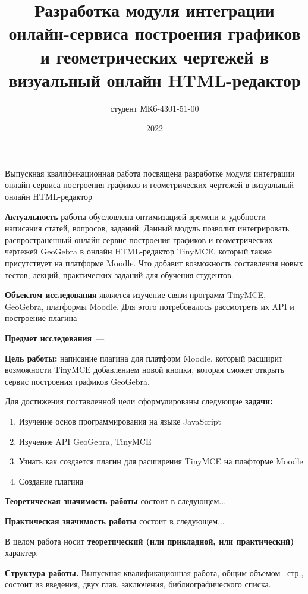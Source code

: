 \documentclass[14pt,Diplom]{diplomwork}
\date{2022}
\author{студент МКб-4301-51-00}{Мельков Алексей Константинович}
\title{Разработка модуля интеграции онлайн-сервиса построения графиков и геометрических чертежей в визуальный онлайн HTML-редактор}
\institute{математики и информационных систем}
\begin{document}
	
\maketitle
\makereferat		%
\newpage

\tableofcontents


Выпускная квалификационная работа посвящена разработке модуля интеграции онлайн-сервиса построения графиков и геометрических чертежей в визуальный онлайн HTML-редактор


\textbf{Актуальность} работы обусловлена оптимизацией времени и удобности написания статей, вопросов, заданий. Данный модуль позволит интегрировать распространенный онлайн-сервис построения графиков и геометрических чертежей GeoGebra в онлайн HTML-редактор TinyMCE, который также присутствует на платформе Moodle. Что добавит возможность составления новых тестов, лекций, практических заданий для обучения студентов.

\textbf{Объектом исследования} является изучение связи программ TinyMCE, GeoGebra, платформы Moodle. Для этого потребовалось рассмотреть их API и построение плагина	

\textbf{Предмет исследования}~--- 

\textbf{Цель работы:} написание плагина для платформ Moodle, который расширит возможности TinyMCE добавлением новой кнопки, которая сможет открыть сервис построения графиков GeoGebra.

Для достижения поставленной цели сформулированы следующие \mbox{\textbf{задачи:}}

\begin{enumerate}
	\item Изучение основ программирования на языке JavaScript
	\item Изучение API GeoGebra, TinyMCE
	\item Узнать как создается плагин для расширения TinyMCE на плафторме Moodle
	\item Создание плагина
\end{enumerate}



\textbf{Теоретическая значимость работы} состоит в следующем...

\textbf{Практическая значимость работы} состоит в следующем...

В целом работа носит \textbf{теоретический (или прикладной, или практический)} характер.



\textbf{Структура работы.} Выпускная квалификационная работа, общим объемом \pageref{LastPage}~стр., состоит из введения, двух глав, заключения, библиографического списка.
\end{document}
